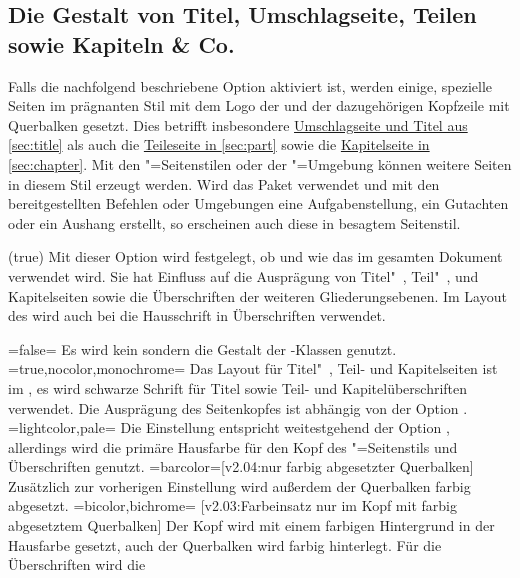 \begin{DeclareEntity*}{}
\begin{DeclareEntity*}{}
\begin{DeclareEntity*}{}
\subsection{%
  Die Gestalt von Titel, Umschlagseite, Teilen sowie Kapiteln \& Co.%
}
%
Falls die nachfolgend beschriebene Option  aktiviert ist, 
werden einige, spezielle Seiten im prägnanten Stil mit dem Logo der \TnUD und 
der dazugehörigen Kopfzeile mit Querbalken gesetzt. Dies betrifft insbesondere 
\hyperref[sec:title]{Umschlagseite und Titel aus \autoref*{sec:title}} als auch 
die \hyperref[sec:part]{Teileseite in \autoref*{sec:part}} sowie die 
\hyperref[sec:chapter]{Kapitelseite in \autoref*{sec:chapter}}. Mit den 
"=Seitenstilen oder der "=Umgebung 
können weitere Seiten in diesem Stil erzeugt werden. Wird das Paket 
 verwendet und mit den bereitgestellten Befehlen oder 
Umgebungen eine Aufgabenstellung, ein Gutachten oder ein Aushang erstellt, so 
erscheinen auch diese in besagtem Seitenstil.
%
\begin{Declaration}
  {}
  (true)
\printdeclarationlist
%
Mit dieser Option wird festgelegt, ob und wie das \TUDCD im gesamten Dokument 
verwendet wird. Sie hat Einfluss auf die Ausprägung von Titel"~, Teil"~, und 
Kapitelseiten sowie die Überschriften der weiteren Gliederungsebenen. 
Im Layout des \CDs wird auch bei  die Hausschrift in 
Überschriften verwendet.
\begin{DeclareValues}
\itemval=false=
  Es wird kein \CD sondern die Gestalt der \KOMAScript-Klassen genutzt.
\itemval*=true,nocolor,monochrome=
  Das Layout für Titel"~, Teil- und Kapitelseiten ist im \CD, es wird 
  schwarze Schrift für Titel sowie Teil- und Kapitelüberschriften verwendet.
  Die Ausprägung des Seitenkopfes ist abhängig von der Option .
\itemval=lightcolor,pale=
  Die Einstellung entspricht weitestgehend der Option , 
  allerdings wird die primäre Hausfarbe  für den Kopf des 
  "=Seitenstils und Überschriften genutzt.
\itemval=barcolor=[v2.04:nur farbig abgesetzter Querbalken]
  Zusätzlich zur vorherigen Einstellung wird außerdem der Querbalken farbig 
  abgesetzt.
\itemval=bicolor,bichrome=%
    [v2.03:Farbeinsatz nur im Kopf mit farbig abgesetztem Querbalken]
  Der Kopf wird mit einem farbigen Hintergrund in der Hausfarbe gesetzt, auch 
  der Querbalken wird farbig hinterlegt. Für die Überschriften wird die 

\end{DeclareValues}
\end{Declaration}
\end{DeclareEntity*}
\end{DeclareEntity*}
\end{DeclareEntity*}
